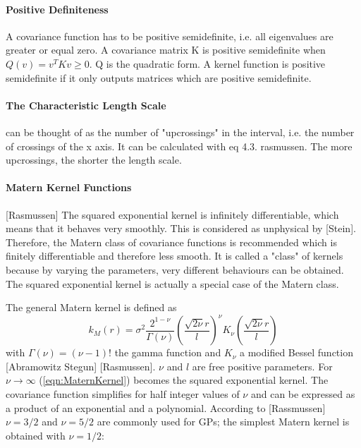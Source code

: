 \documentclass[%
  a4paper,oneside,%
  11pt,%
  smallchapters,
  green,%
  rgb, <cmyk>
  ,]{tubsbook}
\begin{document}
\paragraph{Positive Definiteness}A covariance function has to be positive semidefinite, i.e. all eigenvalues are greater or equal zero. A covariance matrix K is positive semidefinite when $Q(v) = v^T K v \geq 0$. Q is the quadratic form. A kernel function is positive semidefinite if it only outputs matrices which are positive semidefinite.


\paragraph{The Characteristic Length Scale} can be thought of as the number of "upcrossings" in the interval, i.e. the number of crossings of the x axis. It can be calculated with eq 4.3. rasmussen. The more upcrossings, the shorter the length scale.

\paragraph{Matern Kernel Functions}
[Rasmussen] The squared exponential kernel is infinitely differentiable, which means that it behaves very smoothly. This is considered as unphysical by [Stein]. Therefore, the Matern class of covariance functions is recommended which is finitely differentiable and therefore less smooth. It is called a "class" of kernels because by varying the parameters, very different behaviours can be obtained. The squared exponential kernel is actually a special case of the Matern class.

The general Matern kernel is defined as
\begin{equation}
k_M(r) = \sigma^2 \frac{2^{1-\nu}}{\Gamma(\nu)}  \left( \frac{\sqrt{2\nu}r}{l}  \right)^{\nu} K_{\nu}  \left(  \frac{\sqrt{2\nu}r}{l}   \right)
\label{eqn:MaternKernel}
\end{equation}
with $\Gamma(\nu) = (\nu - 1)!$ the gamma function and $K_{\nu}$ a modified Bessel function [Abramowitz Stegun] [Rasmussen]. $\nu$ and $l$ are free positive parameters.
For $\nu \to \infty$  (\ref{eqn:MaternKernel}) becomes the squared exponential kernel.
The covariance function simplifies for half integer values of $\nu$ and can be expressed as a product of an exponential and a polynomial. According to [Rassmussen] $\nu = 3/2$ and $\nu = 5/2$ are commonly used for GPs; the simplest Matern kernel is obtained with $\nu = 1/2$:
\end{document}
